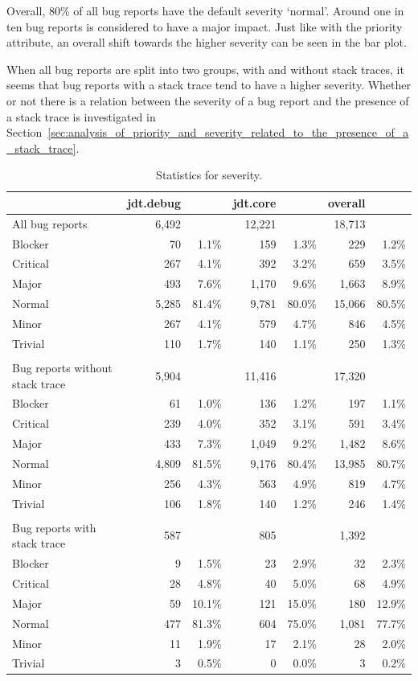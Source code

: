 Overall, 80\% of all bug reports have the default severity `normal'. Around one in ten bug reports is considered to have a major impact. Just like with the priority attribute, an overall shift towards the higher severity can be seen in the bar plot.  

When all bug reports are split into two groups, with and without stack traces, it seems that bug reports with a stack trace tend to have a higher severity. Whether or not there is a relation between the severity of a bug report and the presence of a stack trace is investigated in Section~\ref{sec:analysis_of_priority_and_severity_related_to_the_presence_of_a_stack_trace}.

\begin{table}[!ht]\footnotesize
	\centering
	\begin{tabular}{lrrrrrr}
		\toprule
		& jdt.debug && jdt.core && overall & \\
		\midrule
		All bug reports & 6,492 && 12,221 && 18,713 & \\
		\midrule
		Blocker & 70 & 1.1\% & 159 & 1.3\% & 229 & 1.2\%\\
		Critical & 267 & 4.1\% & 392 & 3.2\% & 659 & 3.5\%\\
		Major & 493 & 7.6\% & 1,170 & 9.6\% & 1,663 & 8.9\%\\
		Normal & 5,285 & 81.4\% & 9,781 & 80.0\% & 15,066 & 80.5\%\\
		Minor & 267 & 4.1\% & 579 & 4.7\% & 846 & 4.5\%\\
		Trivial & 110 & 1.7\% & 140 & 1.1\% & 250 & 1.3\%\\
		\\
		\midrule
		Bug reports without stack trace & 5,904 && 11,416 && 17,320 \\
		\midrule
		Blocker & 61 & 1.0\% & 136 & 1.2\% & 197 & 1.1\%\\
		Critical & 239 & 4.0\% & 352 & 3.1\% & 591 & 3.4\%\\
		Major & 433 & 7.3\% & 1,049 & 9.2\% & 1,482 & 8.6\%\\
		Normal & 4,809 & 81.5\% & 9,176 & 80.4\% & 13,985 & 80.7\%\\
		Minor & 256 & 4.3\% & 563 & 4.9\% & 819 & 4.7\%\\
		Trivial & 106 & 1.8\% & 140 & 1.2\% & 246 & 1.4\%\\
		\\
		\midrule
		Bug reports with stack trace & 587 && 805 && 1,392 \\
		\midrule
		Blocker & 9 & 1.5\% & 23 & 2.9\% & 32 & 2.3\%\\
		Critical & 28 & 4.8\% & 40 & 5.0\% & 68 & 4.9\%\\
		Major & 59 & 10.1\% & 121 & 15.0\% & 180 & 12.9\%\\
		Normal & 477 & 81.3\% & 604 & 75.0\% & 1,081 & 77.7\%\\
		Minor & 11 & 1.9\% & 17 & 2.1\% & 28 & 2.0\%\\
		Trivial & 3 & 0.5\% & 0 & 0.0\% & 3 & 0.2\%\\
		\bottomrule
	\end{tabular} 
	\caption{Statistics for severity.}
	\label{tab:severity}
\end{table}

